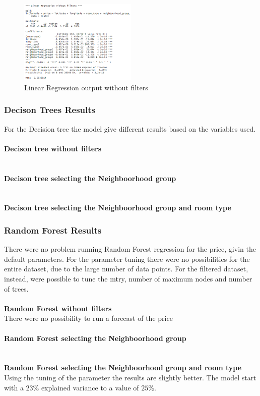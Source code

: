 \documentclass{FR16}
\begin{document}
\begin{figure}[H]
\centering
\includegraphics[width=0.5\textwidth]{figures/lm1.PNG} 
\caption{\label{fig:5} Linear Regression output without filters }
\end{figure}





\subsubsection{Decison Trees Results}
For the Decision tree the model give different results based on the variables used.
\\\\ \textbf{Decison tree  without filters}\\
\\\\
\textbf{Decison tree selecting the Neighboorhood group}\\
\\\\ 
\textbf{Decison tree  selecting the Neighboorhood group and room type}
\subsubsection{Random Forest Results}
There were no problem running Random Forest regression for the price, givin the default parameters. For the parameter tuning there were no possibilities for the entire dataset, due to the large number of data points. For the filtered dataset, instead, were possible to tune the mtry, number of maximum nodes and number of trees.
\\\\ \textbf{Random Forest  without filters}\\
There were no possibility to run a forecast of the price
\\\\
\textbf{Random Forest selecting the Neighboorhood group}\\
\\\\ 
\textbf{Random Forest selecting the Neighboorhood group and room type}
Using the tuning of the parameter the results are slightly better. The model start with a $23\%$ explained variance to a value of $25\%$.
\end{document}
